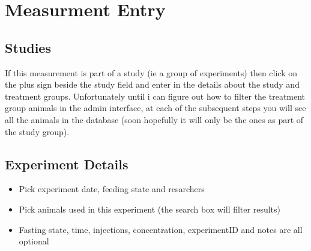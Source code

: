 \documentclass[letterpaper,10pt,english]{sphinxmanual}
\begin{document}
\chapter{Measurment Entry}
\label{usage:measurment-entry}

\section{Studies}
\label{usage:studies}
If this measurement is part of a study (ie a group of experiments) then click on the plus sign beside the study field and enter in the details about the study and treatment groups.  Unfortunately until i can figure out how to filter the treatment group animals in the admin interface, at each of the subsequent steps you will see all the animals in the database (soon hopefully it will only be the ones as part of the study group).



\section{Experiment Details}
\label{usage:experiment-details}\begin{itemize}
\item {} 
Pick experiment date, feeding state and resarchers


\item {} 
Pick animals used in this experiment (the search box will filter results)


\item {} 
Fasting state, time, injections, concentration, experimentID and notes are all optional


\end{itemize}
\end{document}

